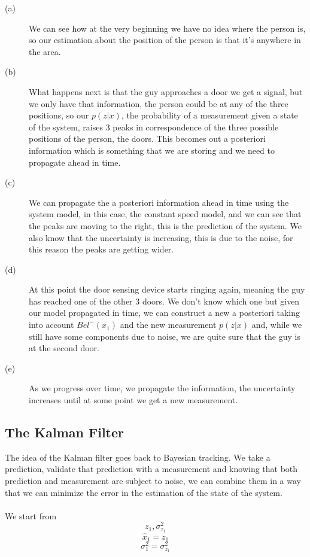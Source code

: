 \begin{description}

\item [(a)] We can see how at the very beginning we have no idea where the person is, so our estimation about the position of the person is that it's anywhere in the area.
\item [(b)] What happens next is that the guy approaches a door we get a signal, but we only have that information, the person could be at any of the three positions, so our $p(z|x)$, the probability of a measurement given a state of the system, raises 3 peaks in correspondence of the three possible positions of the person, the doors. This becomes out a posteriori information which is something that we are storing and we need to propagate ahead  in time.
\item [(c)] We can propagate the a posteriori information ahead in time using the system model, in this case, the constant speed model, and we can see that the peaks are moving to the right, this is the prediction of the system. We also know that the uncertainty is increasing, this is due to the noise, for this reason the peaks are getting wider.
\item [(d)] At this point the door sensing device starts ringing again, meaning the guy has reached one of the other 3 doors. We don't know which one but given our model propagated in time, we can construct a new a posteriori taking into account $Bel^{-}(x_1)$ and the new measurement $p(z|x)$ and, while we still have some components due to noise, we are quite sure that the guy is at the second door.
\item [(e)] As we progress over time, we propagate the information, the uncertainty increases until at some point we get a new measurement.
\end{description}

\subsection{The Kalman Filter}

The idea of the Kalman filter goes back to Bayesian tracking. We take a prediction, validate that prediction with a measurement and knowing that both prediction and measurement are subject to noise, we can combine them in a way that we can minimize the error in the estimation of the state of the system.
\\\\
We start from
\[
    z_1, \sigma^2_{z_1}    
\]
\[
    \hat{x}_1 = z_1
\]
\[
    \sigma^2_1 = \sigma^2_{z_1}    
\]

